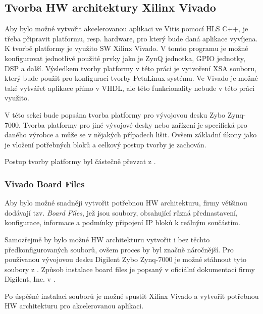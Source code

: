 \documentclass[a4paper, twoside, 11pt]{article}
\begin{document}
	\subsection{Tvorba HW architektury Xilinx Vivado}
		Aby bylo možné vytvořit akcelerovanou aplikaci ve Vitis pomocí HLS C++, je třeba připravit platformu, resp. hardware, pro který bude daná aplikace vyvíjena. K tvorbě platformy je využito SW Xilinx Vivado. V tomto programu je možné konfigurovat jednotlivé použité prvky jako je ZynQ jednotka, GPIO jednotky, DSP a další. Výsledkem tvorby platformy v této práci je vytvoření XSA souboru, který bude použit pro konfiguraci tvorby PetaLinux systému. Ve Vivado je možné také vytvářet aplikace přímo v VHDL, ale této funkcionality nebude v této práci využito.\par
		V této sekci bude popsána tvorba platformy pro vývojovou desku Zybo Zynq-7000. Tvorba platformy pro jiné vývojové desky nebo zařízení je specifická pro daného výrobce a může se v nějakých případech lišit. Ovšem základní úkony jako je vložení potřebných bloků a celkový postup tvorby je zachován.\par
		Postup tvorby platformy byl částečně převzat z \cite{hackster-vitis-2021-1-embedded-platform-for-zybo-z7-20}.

		\subsubsection{Vivado Board Files}\label{subsubsec:vivado-board-files}
			Aby bylo možné snadněji vytvořit potřebnou HW architekturu, firmy většinou dodávají tzv. \textit{Board Files}, jež jsou soubory, obsahující různá přednastavení, konfigurace, informace a podmínky připojení IP bloků k reálným součástím. \cite{github-vivado-board-files-for-digilent-fpga-boards}\par
			Samozřejmě by bylo možné HW architekturu vytvořit i bez těchto předkonfigurovaných souborů, ovšem proces by byl značně náročnější. Pro používanou vývojovou desku Digilent Zybo Zynq-7000 je možné stáhnout tyto soubory z \cite{github-vivado-board-files-for-digilent-fpga-boards}. Způsob instalace board files je popsaný v oficiální dokumentaci firmy Digilent, Inc. v \cite{digilent-installing-vivado-vitis-and-digilent-board-files}.\par
			Po úspěšné instalaci souborů je možné spustit Xilinx Vivado a vytvořit potřebnou HW architekturu pro akcelerovanou aplikaci.
		
\end{document}
